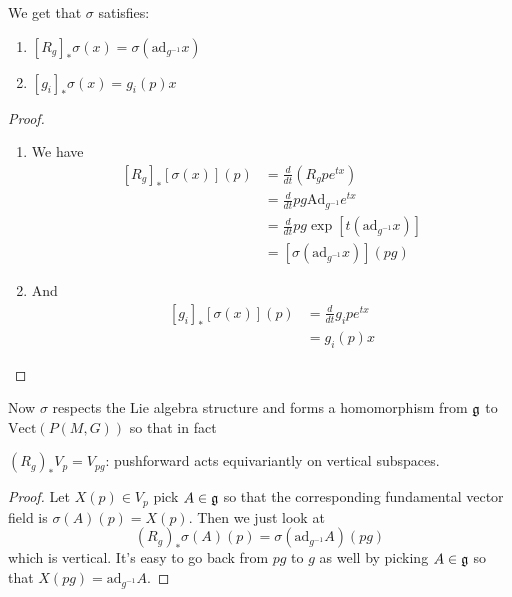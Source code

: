 		\begin{lemma}
			We get that $\sigma$ satisfies:
			\begin{enumerate}
				\item $[R_{g}]_* \sigma(x) = \sigma(\text{ad}_{g^{-1}} x)$
				\item $[g_i]_* \sigma(x) = g_i(p) x$
			\end{enumerate}
		\end{lemma}
		\begin{proof}
			\begin{enumerate}
				\item We have
				\begin{equation}
					\begin{aligned}
						\left[ R_{g} \right]_* [\sigma(x)](p)  &= \frac{d}{dt} (R_g p e^{tx}) \\
						& = \frac{d}{dt} p g \text{Ad}_{g^{-1}} e^{tx}\\ 
						& = \frac{d}{dt} p g \exp[ t (\text{ad}_{g^{-1}} x) ]\\
						& = [\sigma(\text{ad}_{g^{-1}} x)] (pg)
					\end{aligned}
				\end{equation}
				\item And
				\begin{equation}
					\begin{aligned}
						\left[g_i\right]_* [\sigma(x)](p) &= \frac{d}{dt} g_i p e^{t x}\\
											&= g_i(p) x
					\end{aligned}
				\end{equation}
			\end{enumerate}
		\end{proof}
	
		Now $\sigma$ respects the Lie algebra structure and forms a homomorphism from $\frak g$ to $\text{Vect}(P(M,G))$ so that in fact
		\begin{cor}\label{cor:verticalequiv}
			$(R_g)_* V_p = V_{pg}$: pushforward acts equivariantly on vertical subspaces.
		\end{cor}
		\begin{proof}
			Let $X(p) \in V_p$ pick $A \in \frak g$ so that the corresponding fundamental vector field is $\sigma(A) (p) = X(p)$. Then we just look at
			\begin{equation}
				(R_g)_* \sigma(A) (p) = \sigma(\mathrm{ad}_{g^{-1}} A)(pg)
			\end{equation} 
			which is vertical. It's easy to go back from $pg$ to $g$ as well by picking $A \in \frak g$ so that $X(pg) = \mathrm{ad}_{g^{-1}} A$.
		\end{proof}
	
